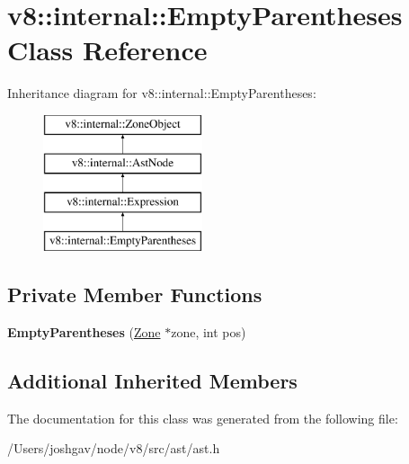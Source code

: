 \hypertarget{classv8_1_1internal_1_1_empty_parentheses}{}\section{v8\+:\+:internal\+:\+:Empty\+Parentheses Class Reference}
\label{classv8_1_1internal_1_1_empty_parentheses}
Inheritance diagram for v8\+:\+:internal\+:\+:Empty\+Parentheses\+:\begin{figure}[H]
\begin{center}
\leavevmode
\includegraphics[height=4.000000cm]{classv8_1_1internal_1_1_empty_parentheses}
\end{center}
\end{figure}
\subsection*{Private Member Functions}
\begin{DoxyCompactItemize}
\item 
{\bfseries Empty\+Parentheses} (\hyperlink{classv8_1_1internal_1_1_zone}{Zone} $\ast$zone, int pos)\hypertarget{classv8_1_1internal_1_1_empty_parentheses_aeda971e6bf741158b7d326ecdc12c96d}{}\label{classv8_1_1internal_1_1_empty_parentheses_aeda971e6bf741158b7d326ecdc12c96d}

\end{DoxyCompactItemize}
\subsection*{Additional Inherited Members}


The documentation for this class was generated from the following file\+:\begin{DoxyCompactItemize}
\item 
/\+Users/joshgav/node/v8/src/ast/ast.\+h\end{DoxyCompactItemize}
